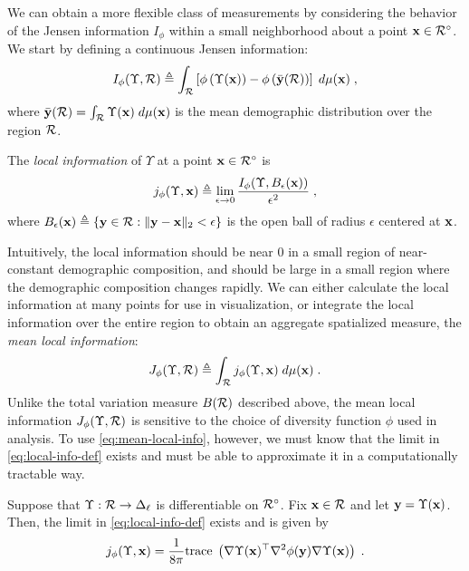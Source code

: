     We can obtain a more flexible class of measurements by considering the behavior of the Jensen information $I_\phi$ within a small neighborhood about a point $\mathbf{x} \in \mathcal{R}^{\circ}$. 
    We start by defining a continuous Jensen information: 
    \begin{align}
      I_\phi(\Upsilon, \mathcal{R}) \triangleq \int_{\mathcal{R}} \left[ \phi\left( \Upsilon(\mathbf{x}) \right) - \phi\left( \bar{\mathbf{y}}(\mathcal{R}) \right) \right] \; d\mu(\mathbf{x}) \;,
    \end{align}
    where $\bar{\mathbf{y}}(\mathcal{R}) = \int_{\mathcal{R}} \Upsilon(\mathbf{x}) \; d\mu(\mathbf{x})$ is the mean demographic distribution over the region $\mathcal{R}$.
    \begin{dfn} \label{dfn:local-info}
      The \emph{local information} of $\Upsilon$ at a point $\mathbf{x} \in \mathcal{R}^{\circ}$ is 
      \begin{align}
        j_\phi(\Upsilon, \mathbf{x}) \triangleq \lim_{\epsilon \rightarrow 0} \frac{I_\phi(\Upsilon, B_\epsilon(\mathbf{x}))}{\epsilon^2}\;,  \label{eq:local-info-def}
      \end{align}
      where $B_\epsilon(\mathbf{x}) \triangleq \{\mathbf{y} \in \mathcal{R} : \lVert \mathbf{y} - \mathbf{x} \rVert_2 < \epsilon\}$ is the open ball of radius $\epsilon$ centered at $\mathbf{x}$.
    \end{dfn}
    Intuitively, the local information should be near 0 in a small region of near-constant demographic composition, and should be large in a small region where the demographic composition changes rapidly.
    We can either calculate the local information at many points for use in visualization, or integrate the local information over the entire region to obtain an aggregate spatialized measure, the \emph{mean local information}: 
    \begin{align}
      J_\phi(\Upsilon, \mathcal{R}) \triangleq \int_{\mathcal{R}} j_\phi(\Upsilon, \mathbf{x}) \;d\mu(\mathbf{x}) \;.  \label{eq:mean-local-info}
    \end{align}
    Unlike the total variation measure $B(\mathcal{R})$ described above, the mean local information $J_\phi(\Upsilon, \mathcal{R})$ is sensitive to the choice of diversity function $\phi$ used in analysis.
    To use \cref{eq:mean-local-info}, however, we must know that the limit in \cref{eq:local-info-def} exists and must be able to approximate it in a computationally tractable way.
    \begin{thm} \label{thm:local-info}
      Suppose that $\Upsilon: \mathcal{R} \rightarrow \Delta_{\ell}$ is differentiable on $\mathcal{R}^{\circ}$. 
      Fix $\mathbf{x} \in \mathcal{R}$ and let $\mathbf{y} = \Upsilon(\mathbf{x})$. 
      Then, the limit in \cref{eq:local-info-def} exists and is given by 
      \begin{align}
        j_\phi(\Upsilon, \mathbf{x}) = \frac{1}{8\pi} \mathrm{trace}\;\left( \nabla \Upsilon(\mathbf{x})^{\top} \nabla^2 \phi(\mathbf{y})  \nabla \Upsilon(\mathbf{x}) \right) \;.  \label{eq:local-info-trace}
      \end{align}
    \end{thm}
    
